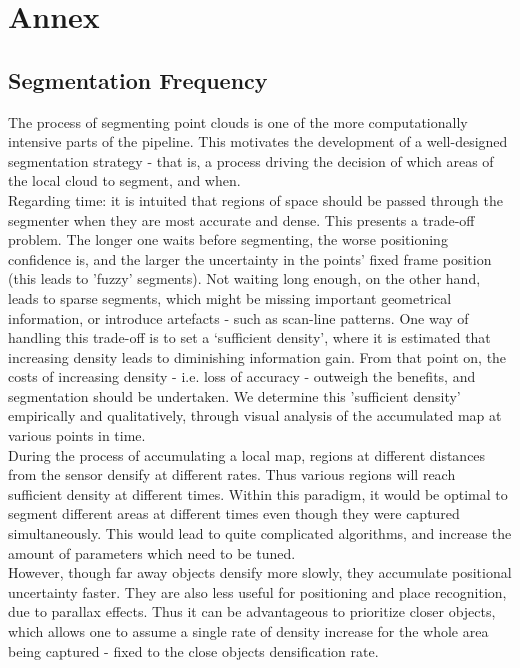 \chapter{Annex}\label{sec:irgendwas}

\section{Segmentation Frequency}
\label{subsec:segmentation-frequency}

The process of segmenting point clouds is one of the more computationally intensive parts of the pipeline. This motivates the development of a well-designed segmentation strategy - that is, a process driving the decision of which areas of the local cloud to segment, and when.\\

Regarding time: it is intuited that regions of space should be passed through the segmenter when they are most accurate and dense. This presents a trade-off problem. The longer one waits before segmenting, the worse positioning confidence is, and the larger the uncertainty in the points' fixed frame position (this leads to 'fuzzy' segments).
Not waiting long enough, on the other hand, leads to sparse segments, which might be missing important geometrical information, or introduce artefacts - such as scan-line patterns.
One way of handling this trade-off is to set a `sufficient density', where it is estimated that increasing density leads to diminishing information gain. 
From that point on, the costs of increasing density - i.e. loss of accuracy - outweigh the benefits, and segmentation should be undertaken. We determine this 'sufficient density' empirically and qualitatively, through visual analysis of the accumulated map at various points in time.\\

During the process of accumulating a local map, regions at different distances from the sensor densify at different rates. Thus various regions will reach sufficient density at different times.
Within this paradigm, it would be optimal to segment different areas at different times even though they were captured simultaneously.
This would lead to quite complicated algorithms, and increase the amount of parameters which need to be tuned.\\

However, though far away objects densify more slowly, they accumulate positional uncertainty faster. They are also less useful for positioning and place recognition, due to parallax effects.
Thus it can be advantageous to prioritize closer objects, which allows one to assume a single rate of density increase for the whole area being captured - fixed to the close objects densification rate.\\

